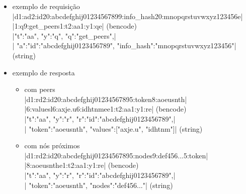 
\newpage
\begin{itemize}
    \item exemplo de requisição \\
        \bverb|d1:ad2:id20:abcdefghij01234567899:info_hash20:mnopqrstuvwxyz123456e|\\
        \bverb|1:q9:get_peers1:t2:aa1:y1:qe| (\gls*{bencode}) \\
        \sverb|{"t":"aa", "y":"q", "q":"get_peers",|\\
        \sverb| "a":{"id":"abcdefghij0123456789", "info_hash":"mnopqrstuvwxyz123456"}}| (\gls*{string})

    \item exemplo de resposta
        \begin{itemize}
            \item com \glspl*{peer} \\
                \bverb|d1:rd2:id20:abcdefghij01234567895:token8:aoeusnth|\\
                \bverb|6:valuesl6:axje.u6:idhtnmee1:t2:aa1:y1:re| (\gls*{bencode}) \\
                \sverb|{"t":"aa", "y":"r", "r":{"id":"abcdefghij0123456789",|\\
                \sverb| "token":"aoeusnth", "values":["axje.u", "idhtnm"]}}|
                (\gls*{string})

            \item com nós próximos \\
                \bverb|d1:rd2:id20:abcdefghij01234567895:nodes9:def456...5:token|\\\bverb|8:aoeusnthe1:t2:aa1:y1:re| (\gls*{bencode}) \\
                \sverb|{"t":"aa", "y":"r", "r":{"id":"abcdefghij0123456789",|\\
                \sverb| "token":"aoeusnth", "nodes":"def456..."}}| (\gls*{string})
        \end{itemize}
\end{itemize}
